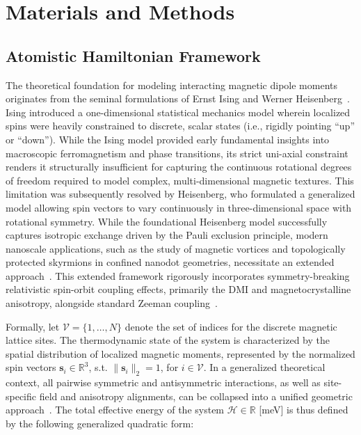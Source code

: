 \documentclass[final,5p,times,twocolumn]{elsarticle}
\begin{document}
\section{Materials and Methods}\label{sec:materials}

\subsection{Atomistic Hamiltonian Framework}\label{sec:hamiltonian}

The theoretical foundation for modeling interacting magnetic dipole moments originates from the seminal formulations of Ernst Ising and Werner Heisenberg~\cite{agudelo2019study}. Ising introduced a one-dimensional statistical mechanics model wherein localized spins were heavily constrained to discrete, scalar states (i.e., rigidly pointing ``up'' or ``down''). While the Ising model provided early fundamental insights into macroscopic ferromagnetism and phase transitions, its strict uni-axial constraint renders it structurally insufficient for capturing the continuous rotational degrees of freedom required to model complex, multi-dimensional magnetic textures. This limitation was subsequently resolved by Heisenberg, who formulated a generalized model allowing spin vectors to vary continuously in three-dimensional space with rotational symmetry. While the foundational 
Heisenberg model successfully captures isotropic exchange driven by the Pauli exclusion principle, modern nanoscale applications, such as the study of magnetic vortices and topologically protected skyrmions in confined nanodot geometries, necessitate an extended 
approach~\cite{fert2024electrical}. This extended framework rigorously incorporates symmetry-breaking relativistic spin-orbit coupling effects, primarily the DMI and magnetocrystalline anisotropy, alongside standard Zeeman coupling~\cite{borisov2021heisenberg}.

Formally, let $\mathcal{V} = \{1, \dots, N\}$ denote the set of indices for the discrete magnetic lattice sites. The thermodynamic state of the system is characterized by the spatial distribution of localized magnetic moments, represented by the normalized spin vectors $\mathbf{s}_i \in \mathbb{R}^3$, s.t. $\|\mathbf{s}_i\|_2 = 1$, for $i\in\mathcal{V}$. In a generalized theoretical context, all pairwise symmetric and antisymmetric interactions, as well as site-specific field and anisotropy alignments, can be collapsed into a unified geometric approach~\cite{eriksson2017atomistic}. The total effective energy of the system $\mathcal{H}\in\mathbb{R}$ [meV] is thus defined by the following generalized quadratic form:
\end{document}
